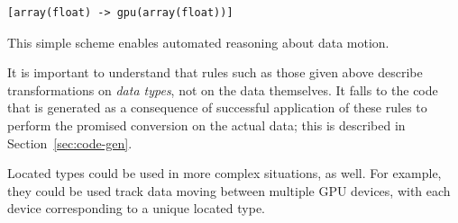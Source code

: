 \begin{verbatim}
[array(float) -> gpu(array(float))]
\end{verbatim}

This simple scheme enables automated reasoning about data motion.

It is important to understand that rules such as those given above describe transformations on \emph{data types}, not on the data themselves. It falls to the code that is generated as a consequence of successful application of these rules to perform the promised conversion on the actual data; this is described in Section~\ref{sec:code-gen}.

Located types could be used in more complex situations, as well. For example, they could be used track data moving between multiple GPU devices, with each device corresponding to a unique located type.
